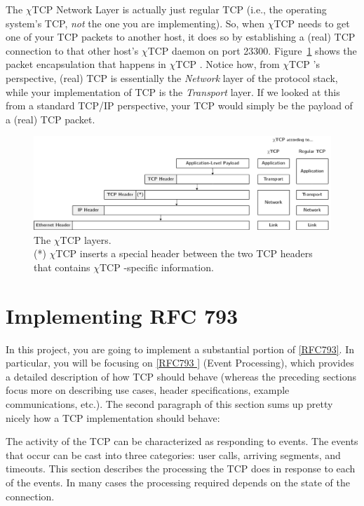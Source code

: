 \documentclass[10pt]{article}
\newcommand{\chitcp}{$\chi$\textsf{TCP} }
\newcommand{\RFC}[1]{\href{http://tools.ietf.org/html/rfc#1}{[RFC#1]}}
\newcommand{\RFCsection}[2]{\href{http://tools.ietf.org/html/rfc#1\#section-#2}{[RFC#1 \textsection #2]}}
\newenvironment{example}%
{\VerbatimEnvironment\begin{Sbox}\begin{VerbExample}}%
{\end{VerbExample}\end{Sbox}\setlength{\fboxsep}{8pt}\begin{center}\fcolorbox{black}{backgroundgray}{\TheSbox}\end{center}}
\begin{document}
The \chitcp Network Layer is actually just regular TCP (i.e., the operating system's TCP, \emph{not} the one you are implementing). So, when \chitcp needs to get one of your TCP packets to another host, it does so by establishing a (real) TCP connection to that other host's \chitcp daemon on port 23300. Figure~\ref{fig:layers} shows the packet encapsulation that happens in \chitcp. Notice how, from \chitcp's perspective, (real) TCP is essentially the \emph{Network} layer of the protocol stack, while your implementation of TCP is the \emph{Transport} layer. If we looked at this from a standard TCP/IP perspective, your TCP would simply be the payload of a (real) TCP packet.


\begin{figure}
\begin{center}
\includegraphics[width=1\textheight]{layers.png}
\caption{The \chitcp layers.\\ \textsf{(*)} \chitcp inserts a special header between the two TCP headers that contains \chitcp-specific information.}
\label{fig:layers}
\end{center}
\end{figure}

\section{Implementing RFC 793}

In this project, you are going to implement a substantial portion of \RFC{793}. In particular, you will be focusing on \RFCsection{793}{3.9} (Event Processing), which provides a detailed description of how TCP should behave (whereas the preceding sections focus more on describing use cases, header specifications, example communications, etc.). The second paragraph of this section sums up pretty nicely how a TCP implementation should behave:

\begin{example}
  The activity of the TCP can be characterized as responding to events.
  The events that occur can be cast into three categories:  user calls,
  arriving segments, and timeouts.  This section describes the
  processing the TCP does in response to each of the events.  In many
  cases the processing required depends on the state of the connection.
\end{example}
\end{document}

